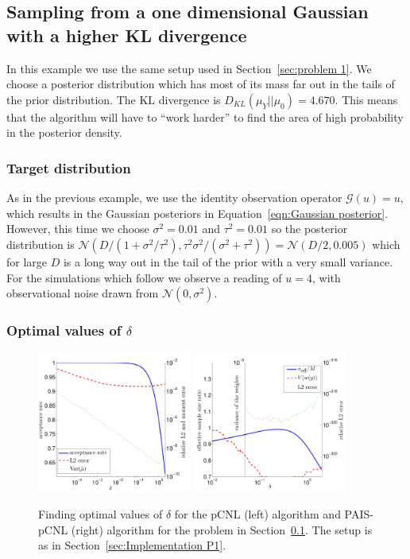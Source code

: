 \documentclass[final]{siamltex}
\newcommand{\G}{\mathcal{G}}
\newcommand{\N}{\mathcal{N}}
\begin{document}
\subsection{Sampling from a one dimensional Gaussian with a higher KL divergence}\label{sec:problem 2}

In this example we use the same setup used in Section~\ref{sec:problem 1}. We choose a posterior distribution which has most of its mass far out in the tails of the prior distribution. The KL divergence is $D_{KL}(\mu_Y||\mu_0) = 4.670$. This means that the algorithm will have to ``work harder'' to find the area of high probability in the posterior density.

\subsubsection{Target distribution}

As in the previous example, we use the identity observation operator
$\G(u)=u$, which results in the Gaussian posteriors in
Equation~\ref{eqn:Gaussian posterior}. However, this time we choose
$\sigma^2=0.01$ and $\tau^2=0.01$ so the posterior distribution is
$\N(D/(1+\sigma^2/\tau^2), \tau^2\sigma^2/(\sigma^2+\tau^2)) = \N(D/2,
0.005)$ which for large $D$ is a long way out in the tail of the prior
with a very small variance. For the simulations which follow we
observe a reading of $u=4$, with observational noise drawn from $\N(0, \sigma^2)$.

\subsubsection{Optimal values of $\delta$}

\begin{figure}[htb]
\centering
\includegraphics[width=0.45\textwidth]{"figures/pCNL2o"}
\includegraphics[width=0.45\textwidth]{"figures/PAISpCNL2o"}
\caption{Finding optimal values of $\delta$ for the pCNL (left) algorithm and PAIS-pCNL (right) algorithm for the problem in Section~\ref{sec:problem 2}. The setup is as in Section~\ref{sec:Implementation P1}.}
\label{fig:P2 opt delta}
\end{figure}
\end{document}
